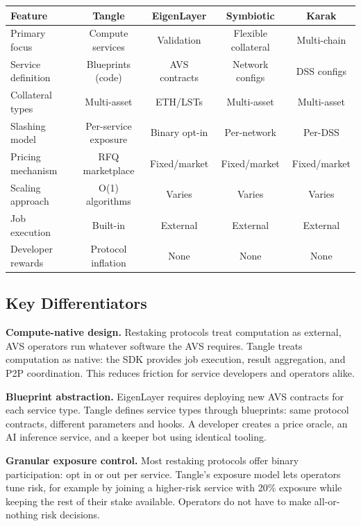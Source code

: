 \documentclass[11pt,a4paper]{article}
\begin{document}
\begin{center}
\begin{tabular}{|l|c|c|c|c|}
\hline
\textbf{Feature} & \textbf{Tangle} & \textbf{EigenLayer} & \textbf{Symbiotic} & \textbf{Karak} \\
\hline
Primary focus & Compute services & Validation & Flexible collateral & Multi-chain \\
Service definition & Blueprints (code) & AVS contracts & Network configs & DSS configs \\
Collateral types & Multi-asset & ETH/LSTs & Multi-asset & Multi-asset \\
Slashing model & Per-service exposure & Binary opt-in & Per-network & Per-DSS \\
Pricing mechanism & RFQ marketplace & Fixed/market & Fixed/market & Fixed/market \\
Scaling approach & O(1) algorithms & Varies & Varies & Varies \\
Job execution & Built-in & External & External & External \\
Developer rewards & Protocol inflation & None & None & None \\
\hline
\end{tabular}
\end{center}

\subsection{Key Differentiators}

\textbf{Compute-native design.} Restaking protocols treat computation as external, AVS operators run whatever software the AVS requires. Tangle treats computation as native: the SDK provides job execution, result aggregation, and P2P coordination. This reduces friction for service developers and operators alike.

\textbf{Blueprint abstraction.} EigenLayer requires deploying new AVS contracts for each service type. Tangle defines service types through blueprints: same protocol contracts, different parameters and hooks. A developer creates a price oracle, an AI inference service, and a keeper bot using identical tooling.

\textbf{Granular exposure control.} Most restaking protocols offer binary participation: opt in or out per service. Tangle's exposure model lets operators tune risk, for example by joining a higher-risk service with 20\% exposure while keeping the rest of their stake available. Operators do not have to make all-or-nothing risk decisions.
\end{document}

